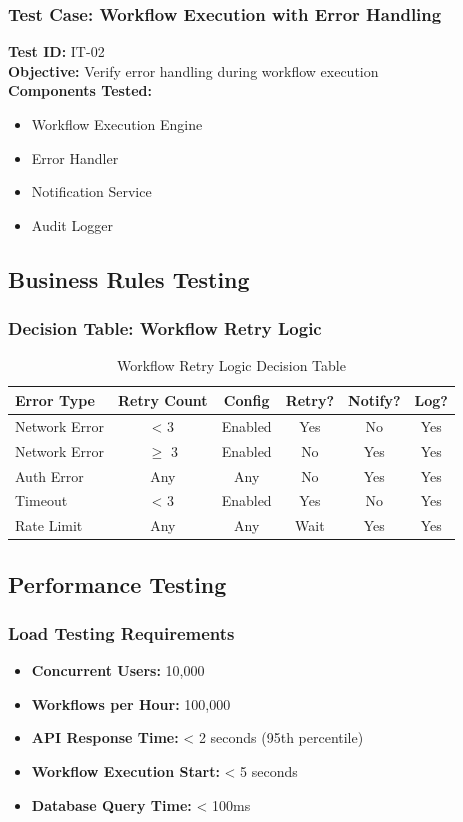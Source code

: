 \documentclass[12pt,a4paper]{article}
\begin{document}
\subsubsection{Test Case: Workflow Execution with Error Handling}
\textbf{Test ID:} IT-02\\
\textbf{Objective:} Verify error handling during workflow execution\\
\textbf{Components Tested:}
\begin{itemize}
    \item Workflow Execution Engine
    \item Error Handler
    \item Notification Service
    \item Audit Logger
\end{itemize}

\subsection{Business Rules Testing}

\subsubsection{Decision Table: Workflow Retry Logic}
\begin{table}[h]
\centering
\begin{tabularx}{\textwidth}{|l|c|c|c|c|c|}
\hline
\textbf{Error Type} & \textbf{Retry Count} & \textbf{Config} & \textbf{Retry?} & \textbf{Notify?} & \textbf{Log?}\\
\hline
Network Error & < 3 & Enabled & Yes & No & Yes\\
\hline
Network Error & $\geq$ 3 & Enabled & No & Yes & Yes\\
\hline
Auth Error & Any & Any & No & Yes & Yes\\
\hline
Timeout & < 3 & Enabled & Yes & No & Yes\\
\hline
Rate Limit & Any & Any & Wait & Yes & Yes\\
\hline
\end{tabularx}
\caption{Workflow Retry Logic Decision Table}
\end{table}

\newpage

\subsection{Performance Testing}

\subsubsection{Load Testing Requirements}
\begin{itemize}
    \item \textbf{Concurrent Users:} 10,000
    \item \textbf{Workflows per Hour:} 100,000
    \item \textbf{API Response Time:} < 2 seconds (95th percentile)
    \item \textbf{Workflow Execution Start:} < 5 seconds
    \item \textbf{Database Query Time:} < 100ms
\end{itemize}
\end{document}
